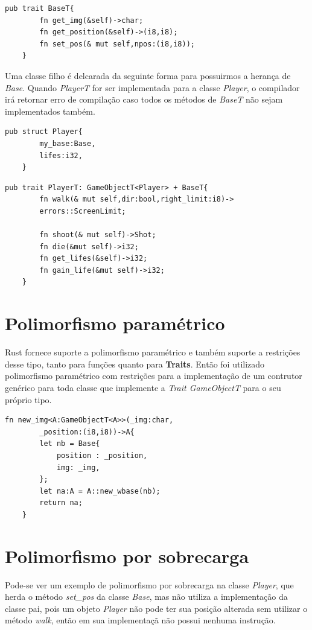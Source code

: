 \documentclass[rel_mlp]{iiufrgs}
\begin{document}
\begin{lstlisting}[frame = single]
    pub trait BaseT{
        fn get_img(&self)->char;
        fn get_position(&self)->(i8,i8);
        fn set_pos(& mut self,npos:(i8,i8));
    }
\end{lstlisting}
 Uma classe filho é delcarada da seguinte forma para possuirmos a herança de \textit{Base}. Quando \textit{PlayerT} for ser implementada para a classe \textit{Player}, o compilador irá retornar erro de compilação caso todos os métodos de \textit{BaseT} não sejam implementados também.
 
 \begin{lstlisting}[frame = single]
    pub struct Player{
        my_base:Base,
        lifes:i32,
    }
 \end{lstlisting}
 
 \begin{lstlisting}[frame = single]
    pub trait PlayerT: GameObjectT<Player> + BaseT{
        fn walk(& mut self,dir:bool,right_limit:i8)->
        errors::ScreenLimit;
        
        fn shoot(& mut self)->Shot;
        fn die(&mut self)->i32;
        fn get_lifes(&self)->i32;
        fn gain_life(&mut self)->i32;
    }
 \end{lstlisting}
 
 \section{Polimorfismo paramétrico}
 Rust fornece suporte a polimorfismo paramétrico e também suporte a restrições desse tipo, tanto para funções quanto para \textbf{Traits}. Então foi utilizado polimorfismo paramétrico com restrições para a implementação de um contrutor genérico para toda classe que implemente a \textit{Trait GameObjectT} para o seu próprio tipo.
 
 
 \begin{lstlisting}[frame = single]
     fn new_img<A:GameObjectT<A>>(_img:char,
        _position:(i8,i8))->A{
        let nb = Base{
            position : _position,
            img: _img,
        };
        let na:A = A::new_wbase(nb);
        return na;
    }
 \end{lstlisting}
 
 \section{Polimorfismo por sobrecarga}
 Pode-se ver um exemplo de polimorfismo por sobrecarga na classe \textit{Player}, que herda o método \textit{set\_pos} da classe \textit{Base}, mas não utiliza a implementação da classe pai, pois um objeto \textit{Player} não pode ter sua posição alterada  sem utilizar o método \textit{walk}, então em sua implementaçã não possui nenhuma instrução.
 
\end{document}
